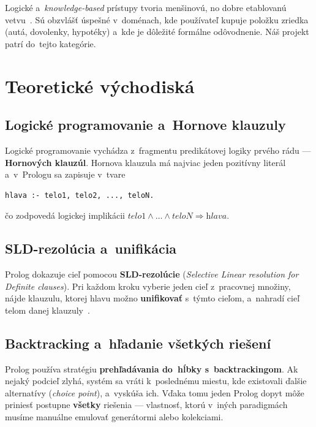 \documentclass[11pt,a4paper]{article}
\begin{document}
Logické a~\emph{knowledge-based} prístupy tvoria menšinovú,
no dobre etablovanú vetvu~\cite{burke2000,felfernig2008}. Sú
obzvlášť úspešné v~doménach, kde používateľ kupuje položku
zriedka (autá, dovolenky, hypotéky) a~kde je dôležité formálne
odôvodnenie. Náš projekt patrí do~tejto kategórie.

\section{Teoretické východiská}

\subsection{Logické programovanie a~Hornove klauzuly}

Logické programovanie vychádza z~fragmentu predikátovej logiky
prvého rádu --- \textbf{Hornových klauzúl}. Hornova klauzula má
najviac jeden pozitívny literál a~v~Prologu sa zapisuje v~tvare

\begin{lstlisting}[numbers=none]
hlava :- telo1, telo2, ..., teloN.
\end{lstlisting}

\noindent
čo zodpovedá logickej implikácii
$\textit{telo1} \land \dots \land \textit{teloN} \Rightarrow
\textit{hlava}$.

\subsection{SLD-rezolúcia a~unifikácia}

Prolog dokazuje cieľ pomocou \textbf{SLD-rezolúcie}
(\emph{Selective Linear resolution for Definite clauses}).
Pri každom kroku vyberie jeden cieľ z~pracovnej množiny, nájde
klauzulu, ktorej hlavu možno \textbf{unifikovať} s~týmto cieľom,
a~nahradí cieľ telom danej klauzuly~\cite{lloyd1987}.

\subsection{Backtracking a~hľadanie všetkých riešení}

Prolog používa stratégiu \textbf{prehľadávania do~hĺbky
s~backtrackingom}. Ak nejaký podcieľ zlyhá, systém sa vráti
k~poslednému miestu, kde existovali ďalšie alternatívy
(\emph{choice point}), a~vyskúša ich. Vďaka tomu jeden Prolog
dopyt môže priniesť postupne \textbf{všetky} riešenia ---
vlastnosť, ktorú v~iných paradigmách musíme manuálne emulovať
generátormi alebo kolekciami.
\end{document}
